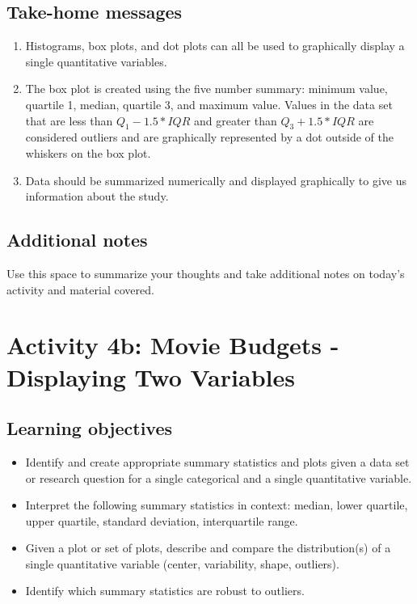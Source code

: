 \documentclass[
]{report}
\begin{document}
\hypertarget{take-home-messages-5}{%
\subsection{Take-home messages}\label{take-home-messages-5}}

\begin{enumerate}
\def\labelenumi{\arabic{enumi}.}
\item
  Histograms, box plots, and dot plots can all be used to graphically display a single quantitative variables.
\item
  The box plot is created using the five number summary: minimum value, quartile 1, median, quartile 3, and maximum value. Values in the data set that are less than \(Q_1 - 1.5*IQR\) and greater than \(Q_3 + 1.5*IQR\) are considered outliers and are graphically represented by a dot outside of the whiskers on the box plot.
\item
  Data should be summarized numerically and displayed graphically to give us information about the study.
\end{enumerate}

\hypertarget{additional-notes-5}{%
\subsection{Additional notes}\label{additional-notes-5}}

Use this space to summarize your thoughts and take additional notes on today's activity and material covered.

\newpage

\hypertarget{activity-4b-movie-budgets---displaying-two-variables}{%
\section{Activity 4b: Movie Budgets - Displaying Two Variables}\label{activity-4b-movie-budgets---displaying-two-variables}}


\hypertarget{learning-objectives-1}{%
\subsection{Learning objectives}\label{learning-objectives-1}}

\begin{itemize}
\item
  Identify and create appropriate summary statistics and plots
  given a data set or research question for a single categorical and a single quantitative variable.
\item
  Interpret the following summary statistics in context:
  median, lower quartile, upper quartile,
  standard deviation, interquartile range.
\item
  Given a plot or set of plots, describe and compare the distribution(s)
  of a single quantitative variable
  (center, variability, shape, outliers).
\item
  Identify which summary statistics are robust to outliers.
\end{itemize}
\end{document}
